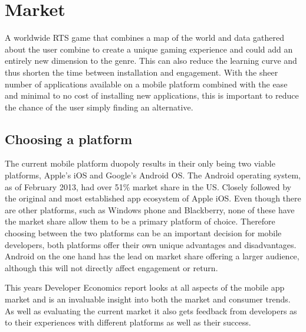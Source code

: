\section{Market}

A worldwide RTS game that combines a map of the world and data gathered about the user combine to create a unique gaming experience and could add an entirely new dimension to the genre. This can also reduce the learning curve and thus shorten the time between installation and engagement. With the sheer number of applications available on a mobile platform combined with the ease and minimal to no cost of installing new applications, this is important to reduce the chance of the user simply finding an alternative.

\subsection{Choosing a platform}
The current mobile platform duopoly results in their only being two viable platforms, Apple's iOS and Google's Android OS. The Android operating system, as of February 2013, had over 51\% market share in the US\cite{smartphone_market}. Closely followed by the original and most established app ecosystem of Apple iOS. Even though there are other platforms, such as Windows phone and Blackberry, none of these have the market share allow them to be a primary platform of choice. Therefore choosing between the two platforms can be an important decision for mobile developers, both platforms offer their own unique advantages and disadvantages. Android on the one hand has the lead on market share offering a larger audience, although this will not directly affect engagement or return.

This years Developer Economics report\cite{de} looks at all aspects of the mobile app market and is an invaluable insight into both the market and consumer trends. As well as evaluating the current market it also gets feedback from developers as to their experiences with different platforms as well as their success.

